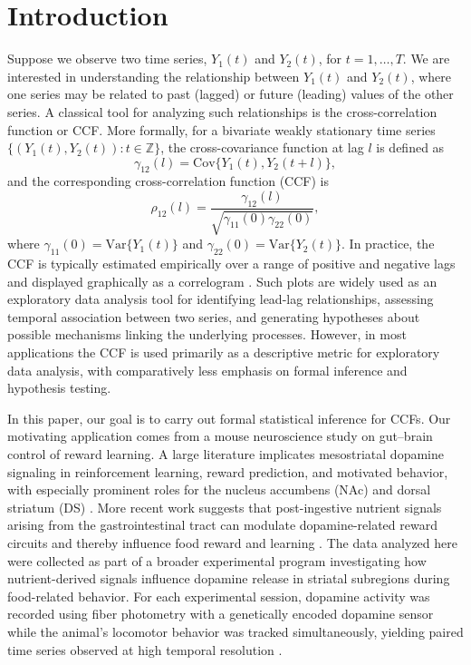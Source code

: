 \documentclass[12pt]{article}
\begin{document}
\noindent%

{} %

\maketitle

\section{Introduction}

Suppose we observe two time series, $Y_1(t)$ and $Y_2(t)$, for $t=1, \ldots, T$.
We are interested in understanding the relationship between $Y_1(t)$ and $Y_2(t)$, where one series may be related to past (lagged) or future (leading) values of the other series.
A classical tool for analyzing such relationships is the cross-correlation function or CCF.
More formally, for a bivariate weakly stationary time series \(\{(Y_1(t),Y_2(t)) : t\in \mathbb{Z}\}\), the cross-covariance function at lag \(l\) is defined as
\[
\gamma_{12}(l)=\mathrm{Cov}\{Y_1(t),Y_2(t+l)\},
\]
and the corresponding cross-correlation function (CCF) is
\[
\rho_{12}(l)=\frac{\gamma_{12}(l)}{\sqrt{\gamma_{11}(0)\gamma_{22}(0)}},
\]
where \(\gamma_{11}(0)=\mathrm{Var}\{Y_1(t)\}\) and \(\gamma_{22}(0)=\mathrm{Var}\{Y_2(t)\}\). In practice, the CCF is typically estimated empirically over a range of positive and negative lags and displayed graphically as a correlogram \citep{brockwell2002introduction,shumway2006time}. Such plots are widely used as an exploratory data analysis tool for identifying lead-lag relationships, assessing temporal association between two series, and generating hypotheses about possible mechanisms linking the underlying processes. However, in most applications the CCF is used primarily as a descriptive metric for exploratory data analysis, with comparatively less emphasis on formal inference and hypothesis testing.

In this paper, our goal is to carry out formal statistical inference for CCFs. Our motivating application comes from a mouse neuroscience study on gut--brain control of reward learning. A large literature implicates mesostriatal dopamine signaling in reinforcement learning, reward prediction, and motivated behavior, with especially prominent roles for the nucleus accumbens (NAc) and dorsal striatum (DS) \citep{schultz1998predictive,schultz2016dopamine}. More recent work suggests that post-ingestive nutrient signals arising from the gastrointestinal tract can modulate dopamine-related reward circuits and thereby influence food reward and learning \citep{dearaujo2012gut,han2018gut,goldstein2021hypothalamic}. The data analyzed here were collected as part of a broader experimental program investigating how nutrient-derived signals influence dopamine release in striatal subregions during food-related behavior. For each experimental session, dopamine activity was recorded using fiber photometry with a genetically encoded dopamine sensor while the animal's locomotor behavior was tracked simultaneously, yielding paired time series observed at high temporal resolution \citep{patriarchi2018dlight}.
\end{document}
